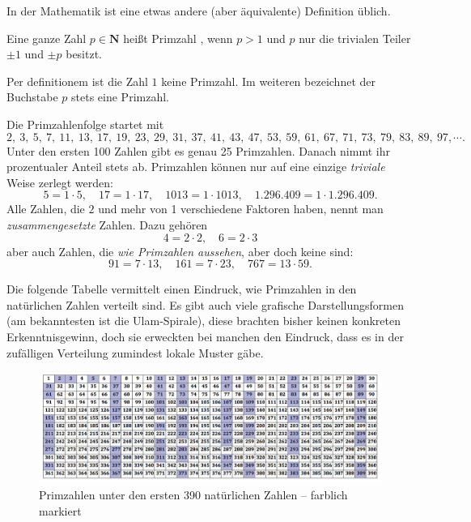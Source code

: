 \begin{refsegment}
In der Mathematik ist eine etwas andere (aber äquivalente) Definition üblich.

\begin{definition}\label{def-pz-prime}
Eine ganze Zahl $p \in \textbf{N}$ heißt Primzahl , wenn $p > 1$ und $p$ nur die trivialen
Teiler $\pm 1$ und $\pm p$ besitzt.
\end{definition}


Per definitionem ist die Zahl $1$ keine Primzahl. Im weiteren bezeichnet der Buchstabe $p$ stets eine Primzahl.

Die Primzahlenfolge startet mit
$$ 2,~ 3,~ 5,~ 7, ~ 11, ~ 13, ~ 17, ~ 19, ~ 23, ~ 29, ~ 31, ~ 37, ~ 41, ~ 43, ~ 47, ~ 53, ~ 59, ~ 61, ~ 67, ~ 71, ~ 73, ~ 79, ~ 83, ~ 89, ~ 97, \cdots .$$
Unter den ersten 100 Zahlen gibt es genau 25 Primzahlen. Danach nimmt ihr prozentualer Anteil stets
ab. Primzahlen können nur auf eine einzige {\em triviale} Weise zerlegt werden:
$$5 = 1 \cdot 5,\quad  17 = 1 \cdot 17, \quad 1013 = 1 \cdot 1013,  \quad 1.296.409 = 1 \cdot 1.296.409.$$
Alle Zahlen, die $2$ und mehr von 1 verschiedene Faktoren haben, nennt man  {\em zusammengesetzte} Zahlen. Dazu gehören
$$ 4 = 2 \cdot 2, \quad 6 = 2\cdot 3 $$
aber auch Zahlen, die {\em wie Primzahlen aussehen}, aber doch keine sind:
$$ 91 = 7 \cdot 13, \quad 161=7 \cdot 23, \quad 767 =13 \cdot 59. $$


\newpage
Die folgende Tabelle vermittelt einen Eindruck, wie Primzahlen in den natürlichen Zahlen verteilt sind. Es gibt auch viele grafische Darstellungsformen (am bekanntesten ist die Ulam-Spirale), diese brachten bisher keinen konkreten Erkenntnisgewinn, doch sie erweckten bei manchen den Eindruck, dass es in der zufälligen Verteilung zumindest lokale Muster gäbe.

\begin{figure}[!hb]
\begin{center}
\includegraphics[scale=0.3]{figures/Numberrectangle-with-colored-primes_Irisprime.jpg}
\caption[Primzahlen unter den ersten 390 natürlichen Zahlen -- farblich markiert]
        {Primzahlen unter den ersten 390 natürlichen Zahlen -- farblich markiert\protect\footnotemark}
\label{Primes-in-a-390-integer-rechtangle-figure}
\end{center}
\end{figure}


\end{refsegment}
